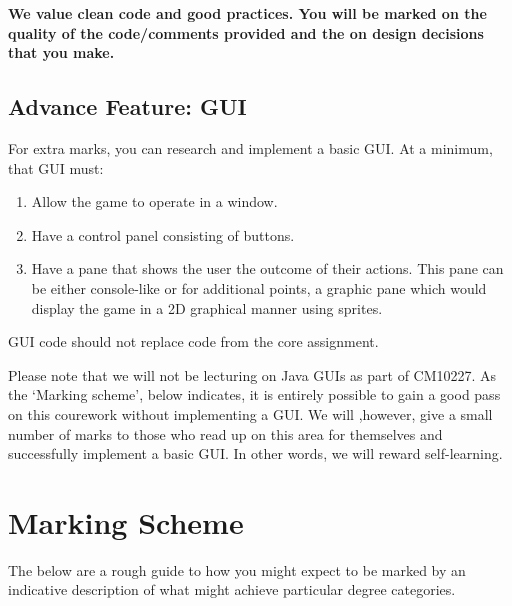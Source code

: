 \documentclass{article}
\begin{document}
{ \textbf{We value clean code and good practices. You will be marked on the quality of the code/comments provided and the on design decisions that you make.}

\subsection{Advance Feature: GUI}
For extra marks, you can research and implement a basic GUI. At a minimum, that GUI must:
\begin{enumerate}
\item Allow the game to operate in a window.
\item Have a control panel consisting of buttons.
\item Have a pane that shows the user the outcome of their actions. This pane can be either console-like or for additional points, a graphic pane which would display the game in a 2D graphical manner using sprites.
\end{enumerate}
GUI code should not replace code from the core assignment.

Please note that we will not be lecturing on Java GUIs as part of CM10227. As the `Marking scheme', below indicates, it is entirely possible to gain a good pass on this courework without implementing a GUI. We will ,however, give a small number of marks to those who read up on this area for themselves and successfully implement a basic GUI. In other words, we will reward self-learning. 

\section{Marking Scheme}
The below are a rough guide to how you might expect to be marked by an indicative description of what might achieve particular degree categories.

}
\end{document}
